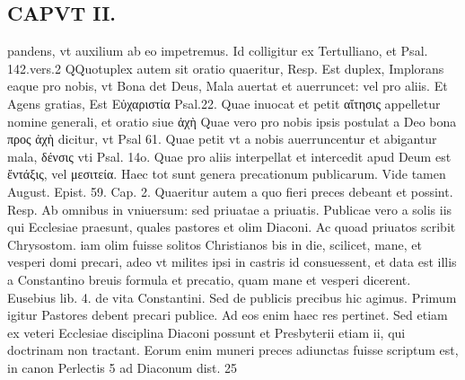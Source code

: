 \documentclass{article}
\begin{document}
\begin{pages}
\section*{CAPVT  II. }
\marginpar{[ p.45 ]}\pstart pandens, vt auxilium ab eo impetremus. Id colligitur ex Tertulliano, et Psal. 142.vers.2 QQuotuplex autem sit oratio quaeritur, Resp. Est duplex, Implorans eaque pro nobis, vt Bona det Deus, Mala auertat et auerruncet: vel pro aliis. Et Agens gratias, Est Εὐχαριστία Psal.22. Quae inuocat et petit αἴτησις appelletur nomine generali, et oratio siue ἀχὴ  Quae vero pro nobis ipsis postulat a Deo bona προς ἀχὴ  dicitur, vt Psal 61. Quae petit vt a nobis auerruncentur et abigantur mala, δένσις vti Psal. 14o. Quae pro aliis interpellat et intercedit apud Deum est ἔντάξις, vel μεσιτεία. Haec tot sunt genera precationum publicarum. Vide tamen August. Epist. 59. Cap. 2. Quaeritur autem a quo fieri preces debeant et possint. Resp. Ab omnibus in vniuersum: sed priuatae a priuatis. Publicae vero a solis iis qui Ecclesiae praesunt, quales pastores et olim Diaconi. Ac quoad priuatos scribit Chrysostom. iam olim fuisse solitos Christianos bis in die, scilicet, mane, et vesperi domi precari, adeo vt milites ipsi in castris id consuessent, et data est illis a Constantino breuis formula et precatio, quam mane et vesperi dicerent. Eusebius lib. 4. de vita Constantini. Sed de publicis precibus hic agimus. Primum igitur Pastores debent precari publice. Ad eos enim haec res pertinet. Sed etiam ex veteri Ecclesiae disciplina Diaconi possunt et Presbyterii etiam ii, qui doctrinam non tractant. Eorum enim muneri preces adiunctas fuisse scriptum est, in canon Perlectis 5 ad Diaconum dist. 25  \pend

\end{pages}
\end{document}
